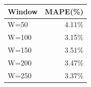 {\tiny\setlength{\tabcolsep}{2pt}\begin{tabular}{lr} \toprule
Window & MAPE(\%) \\ \midrule
W=50 & 4.11\% \\ 
W=100 & 3.15\% \\ 
W=150 & 3.51\% \\ 
W=200 & 3.47\% \\ 
W=250 & 3.37\% \\ 
\bottomrule \end{tabular}}